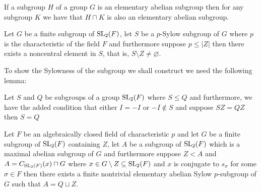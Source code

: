 \begin{remark}
  \label{IsElementaryAbelian.subgroupOf}
  \leanok
  If a subgroup $H$ of a group $G$ is an elementary abelian subgroup then for any subgroup $K$ we have that $H \sqcap K$ is also an elementary abelian subgroup.
\end{remark}


\begin{lemma}
  \label{MaximalAbelianSubgroup.exists_noncenter_of_card_center_lt_card_center_Sylow}
  \leanok
  Let $G$ be a finite subgroup of $\operatorname{SL}_2(F)$, let $S$ be a $p$-Sylow subgroup of $G$ where $p$ is the characteristic of the field $F$ and furthermore suppose $p \le |Z|$ then
  there exists a noncentral element in $S$, that is, $S \setminus Z \ne \varnothing$.
\end{lemma}

To show the Sylowness of the subgroup we shall construct we need the following lemma:

\begin{lemma}
 \label{MaximalAbelianSubgroup.mul_center_inj}
 \leanok
 Let $S$ and $Q$ be subgroups of a group $\operatorname{SL}_2(F)$ where $S \le Q$ and furthermore, we have the added condition that either $I = -I$ or $-I \notin S$ and suppose $SZ = QZ$ then
 $S = Q$
\end{lemma}

\begin{theorem}
\label{MaximalAbelianSubgroup.A_eq_Q_join_Z_of_IsConj_s_or_neg_s}
\leanok
Let $F$ be an algebraically closed field of characteristic $p$ and let $G$ be a finite subgroup of $\operatorname{SL}_2(F)$ containing $Z$, let $A$ be a subgroup of $\operatorname{SL}_2(F)$ which is a maximal abelian subgroup of $G$ and furthermore suppose $Z < A$ and $A = C_{\operatorname{SL}_2(F)}(x) \sqcap G$ where $x \in G \setminus Z \subseteq \operatorname{SL}_2(F)$ and $x$ is conjugate to $s_\sigma$ for some $\sigma \in F$
then there exists a finite nontrivial elementary abelian Sylow $p$-subgroup of $G$ such that $A = Q \sqcup Z$.
\end{theorem}


